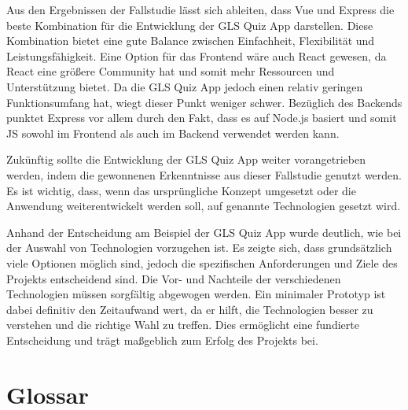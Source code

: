 \documentclass[biblatex]{lni}
\begin{document}
Aus den Ergebnissen der Fallstudie lässt sich ableiten,
dass Vue und Express die beste Kombination für die Entwicklung der GLS Quiz App darstellen.
Diese Kombination bietet eine gute Balance zwischen Einfachheit, Flexibilität und Leistungsfähigkeit.
Eine Option für das Frontend wäre auch React gewesen,
da React eine größere Community hat und somit mehr Ressourcen und Unterstützung bietet.
Da die GLS Quiz App jedoch einen relativ geringen Funktionsumfang hat, wiegt dieser Punkt weniger schwer.
Bezüglich des Backends punktet Express vor allem durch den Fakt,
dass es auf Node.js basiert und somit \ac{JS} sowohl im Frontend als auch im Backend verwendet werden kann.

Zukünftig sollte die Entwicklung der GLS Quiz App weiter vorangetrieben werden,
indem die gewonnenen Erkenntnisse aus dieser Fallstudie genutzt werden.
Es ist wichtig, dass, wenn das ursprüngliche Konzept umgesetzt oder die Anwendung weiterentwickelt werden soll,
auf genannte Technologien gesetzt wird.

Anhand der Entscheidung am Beispiel der GLS Quiz App wurde deutlich,
wie bei der Auswahl von Technologien vorzugehen ist.
Es zeigte sich, dass grundsätzlich viele Optionen möglich sind,
jedoch die spezifischen Anforderungen und Ziele des Projekts entscheidend sind.
Die Vor- und Nachteile der verschiedenen Technologien müssen sorgfältig abgewogen werden.
Ein minimaler Prototyp ist dabei definitiv den Zeitaufwand wert, da er hilft,
die Technologien besser zu verstehen und die richtige Wahl zu treffen.
Dies ermöglicht eine fundierte Entscheidung und trägt maßgeblich zum Erfolg des Projekts bei.

\newpage
\section{Glossar}
\end{document}
